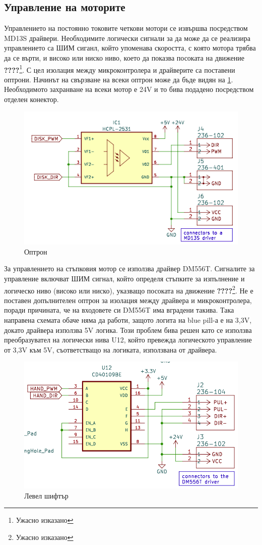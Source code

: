 \subsection{Управление на моторите}

Управлението на постоянно токовите четкови мотори се извършва посредством MD13S драйвери. Необходимите логически сигнали за да може да се реализира управлението са ШИМ сиганл, който упоменава скоростта, с която мотора трябва да се върти, и високо или ниско ниво, което да показва посоката на движение
\textbf{????}\footnote{Ужасно изказано}.
С цел изолация между микроконтролера и драйверите са поставени оптрони. Начинът на свързване на всеки оптрон може да бъде видян на \cref{fig:brushed-control}. Необходимото захранване на всеки мотор е 24V и то бива подадено посредством отделен конектор.


\begin{figure}[H]
    \centering
    \includegraphics[width=0.6\linewidth]{images/brushed-control.png}
    
    \caption{Оптрон}
    \label{fig:brushed-control} 
\end{figure}


За управлението на стъпковия мотор се използва драйвер DM556T. Сигналите за управление включват ШИМ сигнал, който определя стъпките за изпълнение и логическо ниво (високо или ниско), указващо посоката на движение \textbf{????}\footnote{Ужасно изказано}.
Не е поставен допълнителен оптрон за изолация между драйвера и микроконтролера, поради причината, че на входовете си DM556T има вградени такива. Така направена схемата обаче няма да работи, защото логита на blue pill-а е на 3,3V, докато драйвера използва 5V логика. Този проблем бива решен като се използва преобразувател на логически нива U12, който превежда логическото управление от 3,3V към 5V, съответстващо на логиката, използвана от драйвера.

\begin{figure}[H]
    \centering
    \includegraphics[width=0.6\linewidth]{images/stepper-control.png}
    
    \caption{Левел шифтър}
    \label{fig:stepper-control} 
\end{figure}



